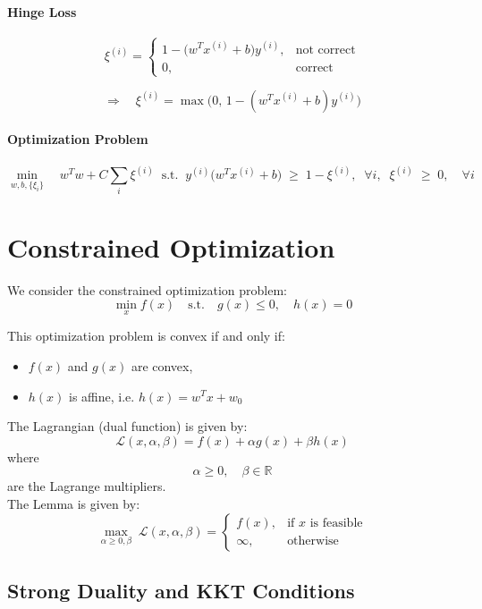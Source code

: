 \documentclass[11pt]{article}
\begin{document}
\paragraph*{Hinge Loss}
\[
\xi^{(i)} =
\begin{cases}
1 - \big(w^T x^{(i)} + b\big)y^{(i)}, & \text{not correct} \\[6pt]
0, & \text{correct}
\end{cases}
\]

\[
\Longrightarrow \quad \xi^{(i)} = \max \big(0, \, 1 - (w^T x^{(i)} + b)y^{(i)}\big)
\]

\paragraph*{Optimization Problem}
\[
 \min_{w,b,\{\xi_i\}} \quad w^T w + C \sum_i \xi^{(i)} 
 \;\; \text{s.t.} \;\; y^{(i)} \big(w^T x^{(i)} + b\big) \;\geq\; 1 - \xi^{(i)}, \;\; \forall i, 
 \;\; \xi^{(i)} \;\geq\; 0, \quad \forall i
\]

\section*{Constrained Optimization}

We consider the constrained optimization problem:
\[
\min_{x} f(x) \quad \text{s.t.} \quad g(x) \leq 0, \quad h(x) = 0
\]

This optimization problem is convex if and only if:
\begin{itemize}
    \item $f(x)$ and $g(x)$ are convex,
    \item $h(x)$ is affine, i.e. \(h(x) = w^T x + w_0\)
\end{itemize}
The Lagrangian (dual function) is given by:
\[
\mathcal{L}(x, \alpha, \beta) = f(x) + \alpha g(x) + \beta h(x)
\]
where
\[
\alpha \geq 0, \quad \beta \in \mathbb{R}
\]
are the Lagrange multipliers.\\ 
The Lemma is given by:
\[
\max_{\alpha \geq 0, \beta} \; \mathcal{L}(x, \alpha, \beta) =
\begin{cases}
f(x), & \text{if $x$ is feasible} \\
\infty, & \text{otherwise}
\end{cases}
\]



\subsection*{Strong Duality and KKT Conditions}
\end{document}

